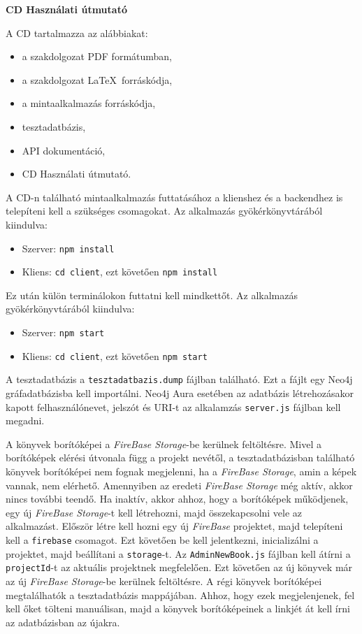 \pagestyle{empty}

\noindent \textbf{\Large CD Használati útmutató}

\vskip 1cm

\noindent A CD tartalmazza az alábbiakat:
\begin{itemize}
    \item a szakdolgozat PDF formátumban,
    \item a szakdolgozat \LaTeX\ forráskódja,
    \item a mintaalkalmazás forráskódja,
    \item tesztadatbázis,
    \item API dokumentáció,
    \item CD Használati útmutató.
\end{itemize}

\bigskip

A CD-n található mintaalkalmazás futtatásához a klienshez és a backendhez is telepíteni kell a szükséges csomagokat. Az alkalmazás gyökérkönyvtárából kiindulva:
\begin{itemize}
    \item Szerver: \texttt{npm install}
    \item Kliens: \texttt{cd client}, ezt követően \texttt{npm install}
\end{itemize}

Ez után külön terminálokon futtatni kell mindkettőt. Az alkalmazás gyökérkönyvtárából kiindulva:
\begin{itemize}
    \item Szerver: \texttt{npm start}
    \item Kliens: \texttt{cd client}, ezt követően \texttt{npm start}
\end{itemize}

A tesztadatbázis a \texttt{tesztadatbazis.dump} fájlban található. Ezt a fájlt egy Neo4j gráfadatbázisba kell importálni. Neo4j Aura esetében az adatbázis létrehozásakor kapott felhasználónevet, jelszót és URI-t az alkalamzás \texttt{server.js} fájlban kell megadni.

\bigskip

A könyvek borítóképei a \textit{FireBase Storage}-be kerülnek feltöltésre.  Mivel a borítóképek elérési útvonala függ a projekt nevétől, a tesztadatbázisban található könyvek borítóképei nem fognak megjelenni, ha a \textit{FireBase Storage}, amin a képek vannak, nem elérhető. Amennyiben az eredeti \textit{FireBase Storage} még aktív, akkor nincs további teendő. Ha inaktív, akkor ahhoz, hogy a borítóképek működjenek, egy új \textit{FireBase Storage}-t kell létrehozni, majd összekapcsolni vele az alkalmazást. Először létre kell hozni egy új \textit{FireBase} projektet, majd telepíteni kell a \texttt{firebase} csomagot. Ezt követően be kell jelentkezni, inicializálni a projektet, majd beállítani a \texttt{storage}-t. Az \texttt{AdminNewBook.js} fájlban kell átírni a \texttt{projectId}-t az aktuális projektnek megfelelően. Ezt követően az új könyvek már az új \textit{FireBase Storage}-be kerülnek feltöltésre. A régi könyvek borítóképei megtalálhatók a tesztadatbázis mappájában. Ahhoz, hogy ezek megjelenjenek, fel kell őket tölteni manuálisan, majd a könyvek borítóképeinek a linkjét át kell írni az adatbázisban az újakra.